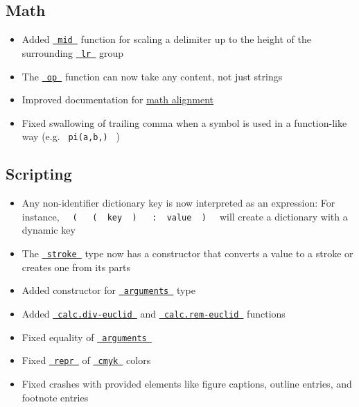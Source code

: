 \subsection{Math}\label{math}

\begin{itemize}
\tightlist
\item
  Added \href{/docs/reference/math/lr/\#functions-mid}{\texttt{\ mid\ }}
  function for scaling a delimiter up to the height of the surrounding
  \href{/docs/reference/math/lr/\#functions-lr}{\texttt{\ lr\ }} group
\item
  The \href{/docs/reference/math/op/}{\texttt{\ op\ }} function can now
  take any content, not just strings
\item
  Improved documentation for
  \href{/docs/reference/math/\#alignment}{math alignment}
\item
  Fixed swallowing of trailing comma when a symbol is used in a
  function-like way (e.g. \texttt{\ pi(a,b,)\ } )
\end{itemize}

\subsection{Scripting}\label{scripting}

\begin{itemize}
\tightlist
\item
  Any non-identifier dictionary key is now interpreted as an expression:
  For instance,
  \texttt{\ }{\texttt{\ (\ }}\texttt{\ }{\texttt{\ (\ }}\texttt{\ key\ }{\texttt{\ )\ }}\texttt{\ }{\texttt{\ :\ }}\texttt{\ value\ }{\texttt{\ )\ }}\texttt{\ }
  will create a dictionary with a dynamic key
\item
  The \href{/docs/reference/visualize/stroke/}{\texttt{\ stroke\ }} type
  now has a constructor that converts a value to a stroke or creates one
  from its parts
\item
  Added constructor for
  \href{/docs/reference/foundations/arguments/}{\texttt{\ arguments\ }}
  type
\item
  Added
  \href{/docs/reference/foundations/calc/\#functions-div-euclid}{\texttt{\ calc.div-euclid\ }}
  and
  \href{/docs/reference/foundations/calc/\#functions-rem-euclid}{\texttt{\ calc.rem-euclid\ }}
  functions
\item
  Fixed equality of
  \href{/docs/reference/foundations/arguments/}{\texttt{\ arguments\ }}
\item
  Fixed \href{/docs/reference/foundations/repr/}{\texttt{\ repr\ }} of
  \href{/docs/reference/visualize/color/\#definitions-cmyk}{\texttt{\ cmyk\ }}
  colors
\item
  Fixed crashes with provided elements like figure captions, outline
  entries, and footnote entries
\end{itemize}

